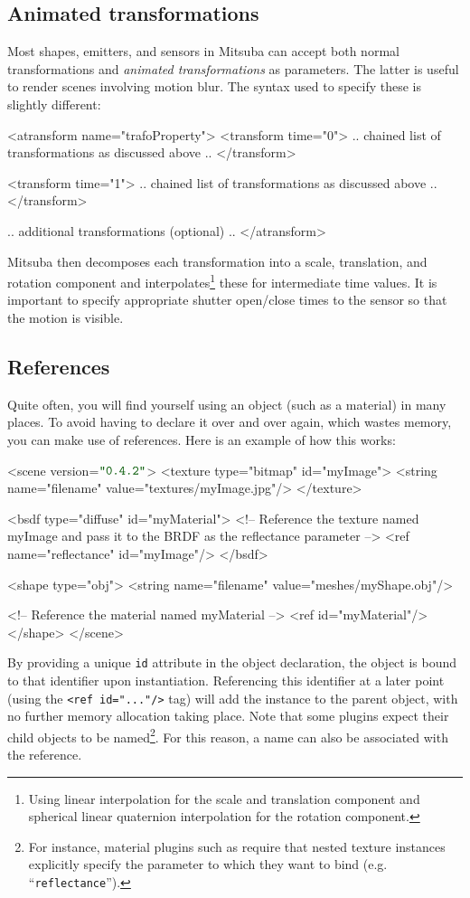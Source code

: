 \subsection{Animated transformations}
Most shapes, emitters, and sensors in Mitsuba can accept both normal transformations
and \emph{animated transformations} as parameters. The latter is useful to
render scenes involving motion blur. The syntax used to specify these
is slightly different:
\begin{xml}
<atransform name="trafoProperty">
  <transform time="0">
     .. chained list of transformations as discussed above ..
  </transform>

  <transform time="1">
     .. chained list of transformations as discussed above ..
  </transform>

  .. additional transformations (optional) ..
</atransform>
\end{xml}
Mitsuba then decomposes each transformation into a scale, translation, and
rotation component and interpolates\footnote{Using linear interpolation
for the scale and translation component and spherical linear quaternion
interpolation for the rotation component.} these for intermediate
time values.
It is important to specify appropriate shutter open/close times
to the sensor so that the motion is visible.

\subsection{References}
Quite often, you will find yourself using an object (such as a material) in many places. To avoid having
to declare it over and over again, which wastes memory, you can make use of references. Here is an example
of how this works:
\begin{xml}
<scene version=$\MtsVer$>
	<texture type="bitmap" id="myImage">
		<string name="filename" value="textures/myImage.jpg"/>
	</texture>

	<bsdf type="diffuse" id="myMaterial">
		<!-- Reference the texture named myImage and pass it
			to the BRDF as the reflectance parameter -->
		<ref name="reflectance" id="myImage"/>
	</bsdf>

	<shape type="obj">
		<string name="filename" value="meshes/myShape.obj"/>

		<!-- Reference the material named myMaterial -->
		<ref id="myMaterial"/>
	</shape>
</scene>
\end{xml}
By providing a unique \texttt{id} attribute in the
object declaration, the object is bound to that identifier
upon instantiation.
Referencing this identifier at a later point (using the \texttt{<ref id="..."/>} tag)
will add the instance to the parent object, with no further memory
allocation taking place. Note that some plugins expect their child objects
to be named\footnote{For instance, material plugins such as  require that
nested texture instances explicitly specify the parameter to which they want to bind (e.g. ``\texttt{reflectance}'').}.
For this reason, a name can also be associated with the reference.

